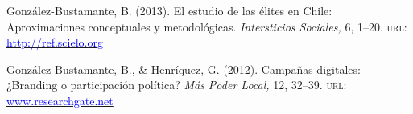 \begin{publications}
\begin{benumerate}{12}
\item{\small Gonz\'alez-Bustamante, B. (2013). El estudio de las élites en Chile: Aproximaciones conceptuales y metodológicas. {\itshape Intersticios Sociales,} 6, 1--20. {\scshape url}: \href{http://ref.scielo.org/zrnp2k}{\textcolor{blue}{http://ref.scielo.org}}} \vspace{1mm}

\item{\small Gonz\'alez-Bustamante, B., \& Henr\'iquez, G. (2012). Campañas digitales: ¿Branding o participación política? {\itshape M\'as Poder Local,} 12, 32--39. {\scshape url}: \href{https://www.researchgate.net/publication/260517478_Campanas_digitales_Branding_o_participacion_politica_El_rol_de_las_redes_sociales_en_la_ultima_campana_presidencial_chilena}{\textcolor{blue}{www.researchgate.net}}} \vspace{1mm}

\end{benumerate}

\end{publications}
